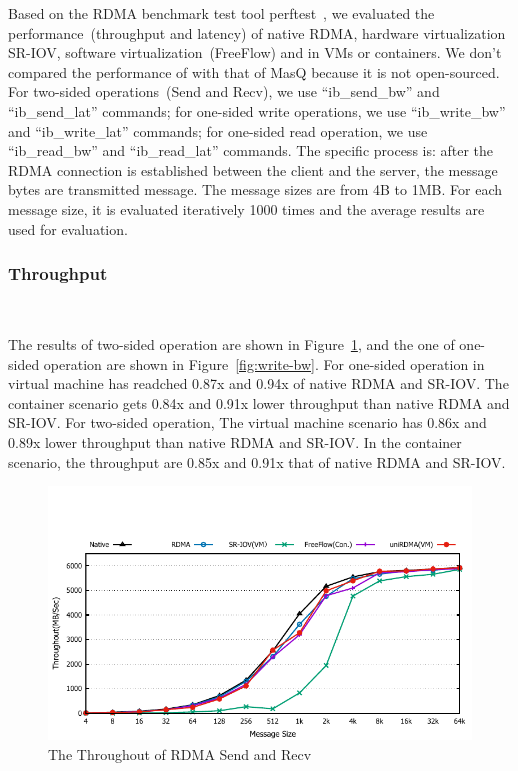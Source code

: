 Based on the RDMA benchmark test tool perftest~\cite{perftest}, we evaluated the performance~(throughput and latency) of native RDMA, hardware virtualization SR-IOV,  software virtualization~(FreeFlow) and \sys in VMs or containers. We don't compared the performance of \sys with that of MasQ because it is not open-sourced. For two-sided operations~(Send and Recv), we use ``ib\_send\_bw'' and ``ib\_send\_lat'' commands; for one-sided write operations, we use ``ib\_write\_bw'' and ``ib\_write\_lat'' commands; for one-sided read operation, we use ``ib\_read\_bw'' and ``ib\_read\_lat'' commands. The specific process is: after the RDMA connection is established between the client and the server, the message bytes are transmitted message. The message sizes are from 4B to 1MB. For each message size,  it is evaluated iteratively 1000 times and the average results are used for evaluation.  

\subsubsection{Throughput}
\
\noindent

The results of two-sided operation are shown in Figure~\ref{fig:send-bw}, and the one of one-sided operation are shown in Figure~\ref{fig:write-bw}. For one-sided operation \sys in virtual machine has readched 0.87x and 0.94x of native RDMA and SR-IOV. The container scenario gets 0.84x and 0.91x lower throughput than native RDMA and SR-IOV. For two-sided operation, The virtual machine scenario has 0.86x and 0.89x lower throughput than native RDMA and SR-IOV. In the container scenario, the throughput are 0.85x and 0.91x that of native RDMA and SR-IOV.

\begin{figure}[!ht]
	\centering
	\includegraphics[width=1.0\linewidth]{images/send-bw.pdf}
	\caption{The Throughout of RDMA Send and Recv}
	\label{fig:send-bw}
\end{figure}

